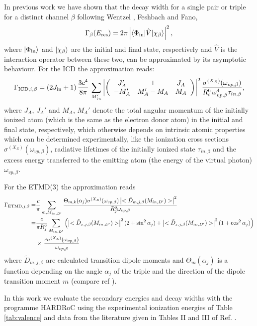 In previous work \cite{Fasshauer13,Fasshauer_thesis} we have shown that
the decay width for a single pair or triple for a distinct channel $\beta$
following Wentzel \cite{Wentzel27}, Feshbach\cite{Feshbach58,Feshbach62}
and Fano,\cite{Fano61}
%
\begin{equation}
 \Gamma_{\beta}(E_{\rm res}) = 2\pi \left|
                           \braket{\Phi_{\rm in}| \hat{V} |\chi_{\beta}}
                           \right|^2,
\end{equation}
%
where $\ket{\Phi_{\rm in}}$ and $\ket{\chi_{\beta}}$ are the initial and final
state, respectively and $\hat{V}$ is the interaction operator between these
two, can be approximated by its asymptotic behaviour.
For the ICD the approximation reads:
%
\begin{equation}
 \Gamma_{{\rm ICD},i,\beta} = (2J_{\rm in}+1)\, \frac{3c^4}{8\pi}\,
                        \sum\limits_{M_{in}'}
                        \left| \left(
                        \begin{array}{ccc}
                        J_A'  & 1        & J_A\\
                        -M_A' & M_A'-M_A & M_A
                        \end{array}\right) \right|^2
                        \frac{\sigma^{(X_E)}(\omega_{vp,\beta})}
                        {R_i^6 \, \omega_{vp,\beta}^4 \tau_{in,\beta}},
\end{equation}
%
where $J_A$, $J_A'$ and $M_A$, $M_A'$ denote the total angular momentum of the
initially ionized atom (which is the same as the electron donor atom) in the
initial and final state, respectively, which otherwise depends on
intrinsic atomic properties
which can be determined experimentally, like the ionization
cross sections
$\sigma^{(X_E)}(\omega_{vp,\beta})$, radiative lifetimes of the initially
ionized state $\tau_{in,\beta}$ and the excess energy transferred to the
emitting atom (the energy of the virtual photon) $\omega_{vp,\beta}$.

For the ETMD(3) the approximation reads
%
\begin{align}
 \Gamma_{{\rm ETMD},j,\beta} =& \frac{c}{\pi} \sum\limits_{m,M_{in,D'}}
                        \frac{\Theta_{m,k}(\alpha_j) \sigma^{(X_E)}(\omega_{vp,\beta})
                              \left| <\tilde{D}_{m,j,\beta}(M_{in,D'})>\right|^2}
                         {R_j^6 \omega_{vp,\beta}}\\
               =& \frac{c}{\pi R_j^6}
               \sum\limits_{M_{in,D'}}
               \left( \left| <\tilde{D}_{x,j,\beta} (M_{in,D'}) > \right|^2
                 (2+ \sin^2\alpha_j)
               + \left| <\tilde{D}_{z,j,\beta} (M_{in,D'}) > \right|^2
                 (1+\cos^2\alpha_j) \right) \nonumber \\
           & \times\, \frac{c\sigma^{(X_E)}(\omega_{vp,\beta})}{\omega_{vp,\beta}}
\end{align}
%
where $\tilde{D}_{m,j,\beta}$ are calculated transition dipole moments and
$\Theta_{m}(\alpha_j)$ is a function depending on the angle $\alpha_j$
of the triple and the direction of the dipole
transition moment $m$
(compare ref ).

In this work we evaluate the secondary energies and decay widths with
the programme HARDRoC\cite{HARDRoC,fasshauer2014} using the
experimental ionization energies of Table \ref{tab:valence}
and data from the literature given in Tables II and III of
Ref. .
